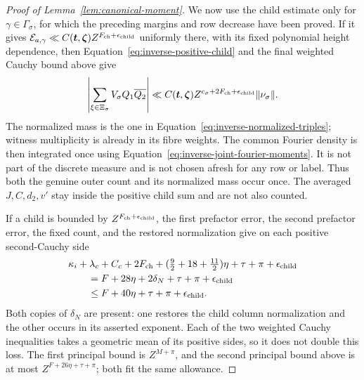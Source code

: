 \documentclass[12pt]{article}
\begin{document}
\begin{proof}[Proof of Lemma~\ref{lem:canonical-moment}]
We now use the child estimate only for
\(\gamma\in\Gamma_\sigma\), for which the preceding margins and row
decrease have been proved.  If it gives
\(\mathcal E_{a,\gamma}\ll C(\boldsymbol t,\boldsymbol\zeta)
Z^{F_{\rm ch}+\epsilon_{\rm child}}\) uniformly there, with its
fixed polynomial height dependence, then
Equation~\eqref{eq:inverse-positive-child} and the final weighted
Cauchy bound above give
\[
 \left|\sum_{\xi\in\Xi_\sigma}V_\sigma Q_1\overline{Q_2}\right|
 \ll C(\boldsymbol t,\boldsymbol\zeta)
 Z^{c_\sigma+2F_{\rm ch}+\epsilon_{\rm child}}\|\nu_\sigma\|.
\]
The normalized mass is the one in
Equation~\eqref{eq:inverse-normalized-triples}; witness multiplicity
is already in its fibre weights.  The common Fourier density is then
integrated once using Equation~\eqref{eq:inverse-joint-fourier-moments}.
It is not part of the discrete measure and is not chosen afresh for
any row or label.  Thus both the genuine outer count and its normalized
mass occur once.  The averaged \(J,C,d_2,v'\) stay inside the positive
child sum and are not also counted.

If a child is bounded by \(Z^{F_{\rm ch}+\epsilon_{\rm child}}\), the
first prefactor error, the second prefactor error, the fixed count, and
the restored normalization give on each positive second-Cauchy side
\begin{equation}\label{eq:inverse-step-loss}
 \begin{split}
 &\kappa_i+\lambda_c+C_c+2F_{\rm ch}
      +(\tfrac92+18+\tfrac{11}2)\eta+\tau+\pi+\epsilon_{\rm child}\\
 &\qquad=F+28\eta+2\delta_N+\tau+\pi+\epsilon_{\rm child}\\
 &\qquad\le F+40\eta+\tau+\pi+\epsilon_{\rm child}.
 \end{split}
\end{equation}
Both copies of \(\delta_N\) are present: one restores the child column
normalization and the other occurs in its asserted exponent.  Each of
the two weighted Cauchy inequalities takes a geometric mean of its
positive sides, so it does not double this loss.  The first principal
bound is \(Z^{M+\pi}\), and the second principal bound above is at most
\(Z^{F+26\eta+\tau+\pi}\); both fit the same allowance.


\end{proof}
\end{document}
